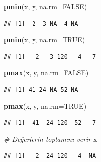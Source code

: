 \documentclass[
]{book}
\newenvironment{Shaded}{\begin{snugshade}}{\end{snugshade}}
\newcommand{\AttributeTok}[1]{\textcolor[rgb]{0.13,0.29,0.53}{#1}}
\newcommand{\CommentTok}[1]{\textcolor[rgb]{0.56,0.35,0.01}{\textit{#1}}}
\newcommand{\ConstantTok}[1]{\textcolor[rgb]{0.56,0.35,0.01}{#1}}
\newcommand{\FunctionTok}[1]{\textcolor[rgb]{0.13,0.29,0.53}{\textbf{#1}}}
\newcommand{\NormalTok}[1]{#1}
\begin{document}
\begin{Shaded}
\begin{Highlighting}[]
\FunctionTok{pmin}\NormalTok{(x, y, }\AttributeTok{na.rm=}\ConstantTok{FALSE}\NormalTok{)}
\end{Highlighting}
\end{Shaded}

\begin{verbatim}
## [1]  2  3 NA -4 NA
\end{verbatim}

\begin{Shaded}
\begin{Highlighting}[]
\FunctionTok{pmin}\NormalTok{(x, y, }\AttributeTok{na.rm=}\ConstantTok{TRUE}\NormalTok{)}
\end{Highlighting}
\end{Shaded}

\begin{verbatim}
## [1]   2   3 120  -4   7
\end{verbatim}

\begin{Shaded}
\begin{Highlighting}[]
\FunctionTok{pmax}\NormalTok{(x, y, }\AttributeTok{na.rm=}\ConstantTok{FALSE}\NormalTok{)}
\end{Highlighting}
\end{Shaded}

\begin{verbatim}
## [1] 41 24 NA 52 NA
\end{verbatim}

\begin{Shaded}
\begin{Highlighting}[]
\FunctionTok{pmax}\NormalTok{(x, y, }\AttributeTok{na.rm=}\ConstantTok{TRUE}\NormalTok{)}
\end{Highlighting}
\end{Shaded}

\begin{verbatim}
## [1]  41  24 120  52   7
\end{verbatim}

\begin{Shaded}
\begin{Highlighting}[]
\CommentTok{\# Değerlerin toplamını verir}
\NormalTok{x}
\end{Highlighting}
\end{Shaded}

\begin{verbatim}
## [1]   2  24 120  -4  NA
\end{verbatim}
\end{document}
